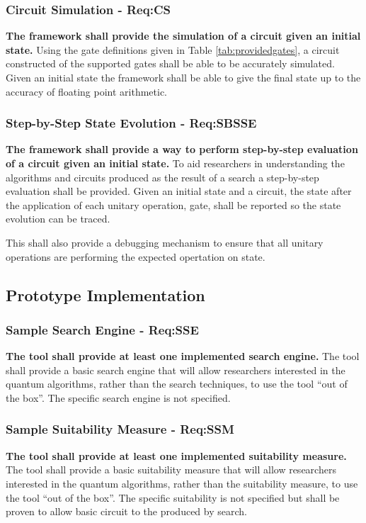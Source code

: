 \subsubsection{Circuit Simulation - Req:CS}
\label{sec:reqcs}
\textbf{The framework shall provide the simulation of a circuit given an initial state.}
Using the gate definitions given in Table \ref{tab:providedgates}, a circuit constructed of the supported gates shall be able to be accurately simulated.
Given an initial state the framework shall be able to give the final state up to the accuracy of floating point arithmetic.

\subsubsection{Step-by-Step State Evolution - Req:SBSSE}
\label{sec:reqsbsse}
\textbf{The framework shall provide a way to perform step-by-step evaluation of a circuit given an initial state.}
To aid researchers in understanding the algorithms and circuits produced as the result of a search a step-by-step evaluation shall be provided.
Given an initial state and a circuit, the state after the application of each unitary operation, gate, shall be reported so the state evolution can be traced.

This shall also provide a debugging mechanism to ensure that all unitary operations are performing the expected opertation on state.

\subsection{Prototype Implementation}
\subsubsection{Sample Search Engine - Req:SSE}
\label{sec:reqsse}
\textbf{The tool shall provide at least one implemented search engine.}
The tool shall provide a basic search engine that will allow researchers interested in the quantum algorithms, rather than the search techniques, to use the tool ``out of the box''.
The specific search engine is not specified.

\subsubsection{Sample Suitability Measure - Req:SSM}
\label{sec:reqssm}
\textbf{The tool shall provide at least one implemented suitability measure.}
The tool shall provide a basic suitability measure that will allow researchers interested in the quantum algorithms, rather than the suitability measure, to use the tool ``out of the box''.
The specific suitability is not specified but shall be proven to allow basic circuit to the produced by search.

